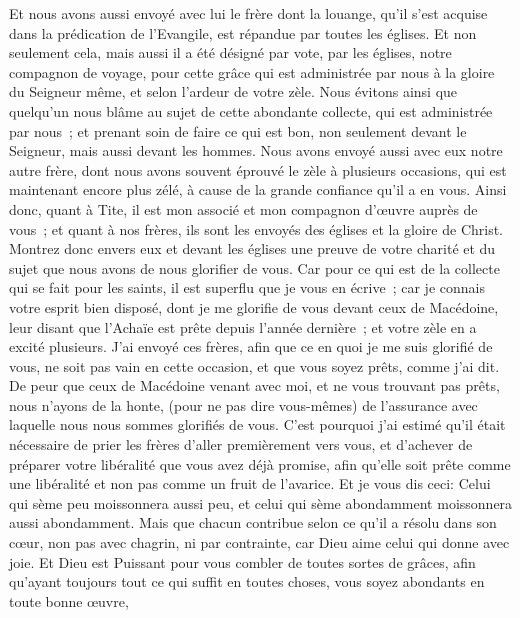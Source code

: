 \begin{multicols}{2}
Et nous avons aussi envoyé avec lui le frère dont la louange, qu'il s'est acquise dans la prédication de l'Evangile, est répandue par toutes les églises.
Et non seulement cela, mais aussi il a été désigné par vote, par les églises, notre compagnon de voyage, pour cette grâce qui est administrée par nous à la gloire du Seigneur même, et selon l'ardeur de votre zèle.
Nous évitons ainsi que quelqu'un nous blâme au sujet de cette abondante collecte, qui est administrée par nous~;
et prenant soin de faire ce qui est bon, non seulement devant le Seigneur, mais aussi devant les hommes.
Nous avons envoyé aussi avec eux notre autre frère, dont nous avons souvent éprouvé le zèle à plusieurs occasions, qui est maintenant encore plus zélé, à cause de la grande confiance qu'il a en vous.
Ainsi donc, quant à Tite, il est mon associé et mon compagnon d'œuvre auprès de vous~; et quant à nos frères, ils sont les envoyés des églises et la gloire de Christ.
Montrez donc envers eux et devant les églises une preuve de votre charité et du sujet que nous avons de nous glorifier de vous.
\VerseOne{}Car pour ce qui est de la collecte qui se fait pour les saints, il est superflu que je vous en écrive~;
car je connais votre esprit bien disposé, dont je me glorifie de vous devant ceux de Macédoine, leur disant que l'Achaïe est prête depuis l'année dernière~; et votre zèle en a excité plusieurs.
J'ai envoyé ces frères, afin que ce en quoi je me suis glorifié de vous, ne soit pas vain en cette occasion, et que vous soyez prêts, comme j'ai dit.
De peur que ceux de Macédoine venant avec moi, et ne vous trouvant pas prêts, nous n'ayons de la honte, (pour ne pas dire vous-mêmes) de l'assurance avec laquelle nous nous sommes glorifiés de vous.
C'est pourquoi j'ai estimé qu'il était nécessaire de prier les frères d'aller premièrement vers vous, et d'achever de préparer votre libéralité que vous avez déjà promise, afin qu'elle soit prête comme une libéralité et non pas comme un fruit de l'avarice.
Et je vous dis ceci: Celui qui sème peu moissonnera aussi peu, et celui qui sème abondamment moissonnera aussi abondamment.
Mais que chacun contribue selon ce qu'il a résolu dans son cœur, non pas avec chagrin, ni par contrainte, car Dieu aime celui qui donne avec joie.
Et Dieu est Puissant pour vous combler de toutes sortes de grâces, afin qu'ayant toujours tout ce qui suffit en toutes choses, vous soyez abondants en toute bonne œuvre,

\end{multicols}
